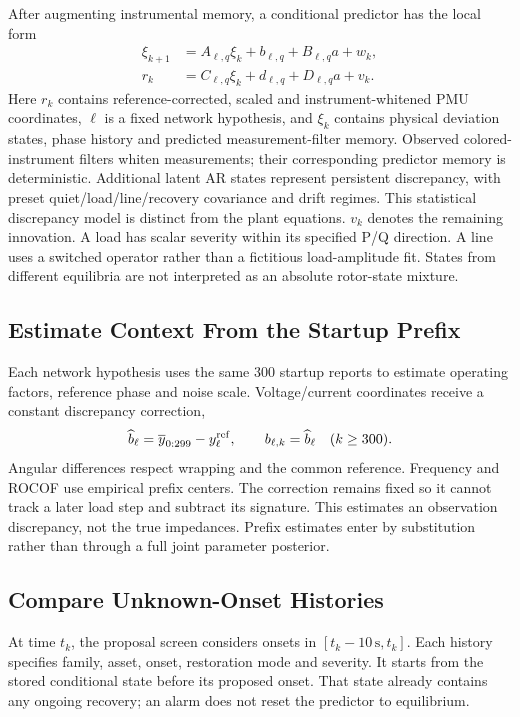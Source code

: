 After augmenting instrumental memory, a conditional predictor has the
local form
\begin{align}
 \xi_{k+1}&=A_{\ell,q}\xi_k+b_{\ell,q}+B_{\ell,q}a+w_k,\nonumber\\
 r_k&=C_{\ell,q}\xi_k+d_{\ell,q}+D_{\ell,q}a+v_k.
 \label{eq:implemented-predictor}
\end{align}
Here $r_k$ contains reference-corrected, scaled and instrument-whitened PMU coordinates, $\ell$ is a fixed
network hypothesis, and $\xi_k$ contains physical deviation states, phase
history and predicted measurement-filter memory. Observed colored-instrument
filters whiten measurements; their corresponding predictor memory is
deterministic. Additional latent AR states represent persistent discrepancy,
with preset quiet/load/line/recovery covariance and drift regimes. This
statistical discrepancy model is distinct from the plant equations.
$v_k$ denotes the remaining innovation. A load has scalar severity within
its specified P/Q direction. A line uses a switched operator rather than
a fictitious load-amplitude fit. States from different equilibria are not
interpreted as an absolute rotor-state mixture.

\subsection{Estimate Context From the Startup Prefix}

Each network hypothesis uses the same 300 startup reports to estimate
operating factors, reference phase and noise scale. Voltage/current
coordinates receive a constant discrepancy correction,
\begin{equation}
 \widehat b_\ell=\overline y_{0:299}-y_\ell^{\rm ref},
 \qquad b_{\ell,k}=\widehat b_\ell\quad(k\ge300).
 \label{eq:continuous-intercept}
\end{equation}
Angular differences respect wrapping and the common reference. Frequency
and ROCOF use empirical prefix centers. The correction remains fixed so it
cannot track a later load step and subtract its signature. This estimates
an observation discrepancy, not the true impedances. Prefix estimates
enter by substitution rather than through a full joint parameter posterior.

\subsection{Compare Unknown-Onset Histories}

At time $t_k$, the proposal screen considers onsets in
$[t_k-10\,\mathrm{s},t_k]$. Each history specifies family, asset, onset,
restoration mode and severity. It starts from the stored conditional state
before its proposed onset. That state already contains any ongoing
recovery; an alarm does not reset the predictor to equilibrium.

